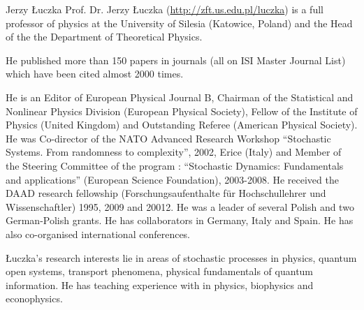
\begin{participant}[type=PI,PM=12,gender=male]{Jerzy Łuczka}
Prof. Dr. Jerzy Łuczka (\url{http://zft.us.edu.pl/luczka}) is
a full professor of physics at the University of Silesia (Katowice,
Poland) and the Head of the the Department of Theoretical Physics.

He published more than 150 papers in journals (all on ISI Master
Journal List) which have been cited almost 2000 times.

He is an Editor of European Physical Journal B, Chairman of the
Statistical and Nonlinear Physics Division (European Physical
Society), Fellow of the Institute of Physics (United Kingdom) and
Outstanding Referee (American Physical Society). He was Co-director of
the NATO Advanced Research Workshop ``Stochastic Systems. From
randomness to complexity'', 2002, Erice (Italy) and Member of the
Steering Committee of the program : ``Stochastic Dynamics: Fundamentals
and applications'' (European Science Foundation), 2003-2008.  He
received the DAAD research fellowship (Forschungsaufenthalte für
Hochschullehrer und Wissenschaftler) 1995, 2009 and 20012. He was a
leader of several Polish and two German-Polish grants. He has
collaborators in Germany, Italy and Spain. He has also co-organised
international conferences.

Łuczka’s research interests lie in areas of stochastic processes in
physics, quantum open systems, transport phenomena, physical
fundamentals of quantum information. He has teaching experience with
\Sage in physics, biophysics and econophysics.


\end{participant}

